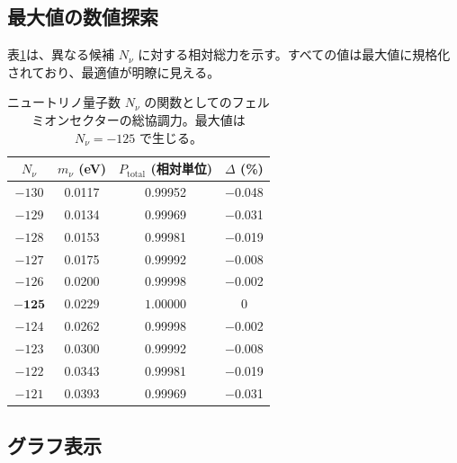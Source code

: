\documentclass[12pt,a4paper]{article}
\begin{document}
	\subsection{最大値の数値探索}
	
	表\ref{tab:power}は、異なる候補 \(N_{\nu}\) に対する相対総力を示す。すべての値は最大値に規格化されており、最適値が明瞭に見える。
	
	\begin{table}[H]
		\centering
		\caption{ニュートリノ量子数 \(N_{\nu}\) の関数としてのフェルミオンセクターの総協調力。最大値は \(N_{\nu}=-125\) で生じる。}
		\label{tab:power}
		\small
		\begin{tabular}{c c c c}
			\toprule
			\(N_{\nu}\) & \(m_{\nu}\) (eV) & \(P_{\mathrm{total}}\) (相対単位) & \(\Delta\) (\%) \\
			\midrule
			\(-130\) & 0.0117 & 0.99952 & $-$0.048 \\
			\(-129\) & 0.0134 & 0.99969 & $-$0.031 \\
			\(-128\) & 0.0153 & 0.99981 & $-$0.019 \\
			\(-127\) & 0.0175 & 0.99992 & $-$0.008 \\
			\(-126\) & 0.0200 & 0.99998 & $-$0.002 \\
			$\mathbf{-125}$ & $\mathbf{0.0229}$ & $\mathbf{1.00000}$ & 0 \\
			\(-124\) & 0.0262 & 0.99998 & $-$0.002 \\
			\(-123\) & 0.0300 & 0.99992 & $-$0.008 \\
			\(-122\) & 0.0343 & 0.99981 & $-$0.019 \\
			\(-121\) & 0.0393 & 0.99969 & $-$0.031 \\
			\bottomrule
		\end{tabular}
	\end{table}
	
	\subsection{グラフ表示}
	
\end{document}
